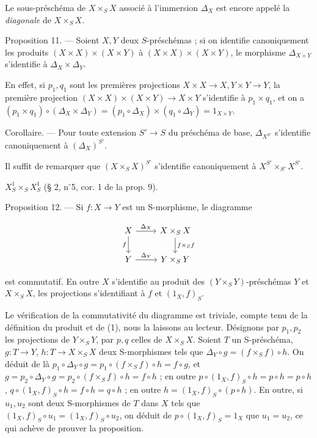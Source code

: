 Le sous-préschéma de $X \times_S X$ associé à l'immersion $\Delta_X$ est encore appelé la \emph{diagonale} de $X \times_S X$.

Proposition 11. --- Soient $X, Y$ deux $S$-préschémas ; si on identifie canoniquement les produits $(X \times X) \times (X \times Y)$ à $(X \times X) \times (X \times Y)$, le morphisme $\Delta_{X \times Y}$ s'identifie à $\Delta_X \times \Delta_Y$.

En effet, si $p_1, q_1$ sont les premières projections $X \times X \to X, Y \times Y \to Y$, la première projection $(X \times X) \times (X \times Y) \to X \times Y$ s'identifie à $p_1 \times q_1$, et on a $(p_1 \times q_1) \circ (\Delta_X \times \Delta_Y) = (p_1 \circ \Delta_X) \times (q_1 \circ \Delta_Y) = 1_{X \times Y}$.

Corollaire. --- Pour toute extension $S' \to S$ du préschéma de base, $\Delta_{X^{S'}}$ s'identifie canoniquement à $(\Delta_X)^{S'}$.

Il suffit de remarquer que $(X \times_S X)^{S'}$ s'identifie canoniquement à $X^{S'} \times_{S'} X^{S'}$.

\newpage


$X_S^1 \times_S X_S^1$ (§ 2, n$^\circ$5, cor. 1 de la prop. 9).

Proposition 12. — Si $f : X \to Y$ est un S-morphisme, le diagramme

$$\begin{tikzcd}
X \arrow[d, "f"'] \arrow[r, "\Delta_X"] & X \times_S X \arrow[d, "f \times_S f"] \\
Y \arrow[r, "\Delta_Y"] & Y \times_S Y
\end{tikzcd}$$

est commutatif. En outre $X$ s'identifie au produit des $(Y \times_S Y)$-préschémas $Y$ et $X \times_S X$, les projections s'identifiant à $f$ et $(1_X, f)_S$.

Le vérification de la commutativité du diagramme est triviale, compte tenu de la définition du produit et de (1), nous la laissons au lecteur. Désignons par $p_1, p_2$ les projections de $Y \times_S Y$, par $p, q$ celles de $X \times_S X$. Soient $T$ un S-préschéma, $g : T \to Y$, $h : T \to X \times_S X$ deux S-morphismes tels que $\Delta_Y \circ g = (f \times_S f) \circ h$. On déduit de là $p_1 \circ \Delta_Y \circ g = p_1 \circ (f \times_S f) \circ h = f \circ g$, et $g = p_2 \circ \Delta_Y \circ g = p_2 \circ (f \times_S f) \circ h = f \circ h$ ; en outre $p \circ (1_X, f)_S \circ h = p \circ h = p \circ h$, $q \circ (1_X, f)_S \circ h = f \circ h = q \circ h$ ; en outre $h = (1_X, f)_S \circ (p \circ h)$. En outre, si $u_1, u_2$ sont deux S-morphismes de $T$ dans $X$ tels que $(1_X, f)_S \circ u_1 = (1_X, f)_S \circ u_2$, on déduit de $p \circ (1_X, f)_S = 1_X$ que $u_1 = u_2$, ce qui achève de prouver la proposition.

